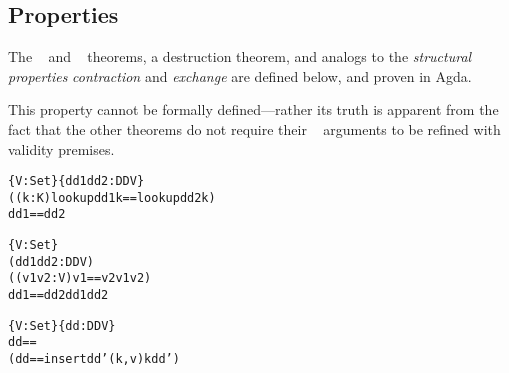 \subsection{Properties}
\label{sec:DD:props}

The \SemInj~ and \EqDec~ theorems, a destruction theorem, and analogs to the \emph{structural properties} \emph{contraction} and \emph{exchange} are defined below, and proven in Agda.


\begin{remark}[\SemTot]
%
\textnormal{This property cannot be formally defined---rather its truth is apparent from the fact that the other theorems do not require their \dd~ arguments to be refined with validity premises.}
%
\end{remark}

\begin{theorem}[\SemInj]
\label{thm:SemInj}
\justIndent
\begin{alltt}
\{V : Set\} \{dd1 dd2 : DD V\} \altRArr
  ((k : K) \altRArr lookup dd1 k == lookup dd2 k) \altRArr
  dd1 == dd2
\end{alltt}
\end{theorem}

\begin{theorem}[\EqDec]
\label{thm:EqDec}
\justIndent
\begin{alltt}
\{V : Set\}
  (dd1 dd2 : DD V) \altRArr
  ((v1 v2 : V) \altRArr v1 == v2 \altOr v1 \altNE v2) \altRArr
  dd1 == dd2 \altOr dd1 \altNE dd2
\end{alltt}
\end{theorem}

\begin{theorem}
\label{thm:EzDstr}
\justIndent
\begin{alltt}
\{V : Set\} \{dd : DD V\} \altRArr
 dd == \altEmpty
   \altOr
 \altSum[ k \altIn K ] \altSum[ v \altIn V ] \altSum[ dd' \altIn DD V ]
   (dd == insert dd' (k, v) \altAnd k \altNIn dd')
\end{alltt}
\end{theorem}

